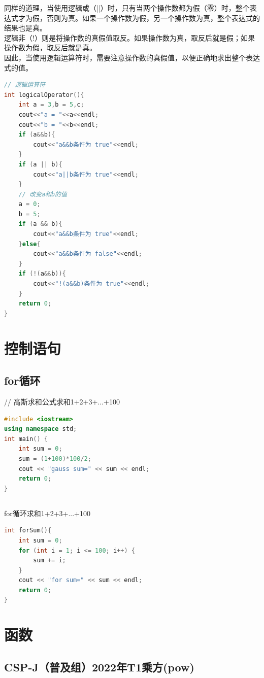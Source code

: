 \documentclass[12pt,twiside,a4paper]{ctexbook}
\numberwithin{chapter}{part}
\begin{document}
同样的道理，当使用逻辑或（||）时，只有当两个操作数都为假（零）时，整个表达式才为假，否则为真。如果一个操作数为假，另一个操作数为真，整个表达式的结果也是真。\\
逻辑非（!）则是将操作数的真假值取反。如果操作数为真，取反后就是假；如果操作数为假，取反后就是真。\\
因此，当使用逻辑运算符时，需要注意操作数的真假值，以便正确地求出整个表达式的值。
\begin{lstlisting}[language=C++]
// 逻辑运算符
int logicalOperator(){
	int a = 3,b = 5,c;
	cout<<"a = "<<a<<endl;
	cout<<"b = "<<b<<endl;
	if (a&&b){
		cout<<"a&&b条件为 true"<<endl;
	}
	if (a || b){
		cout<<"a||b条件为 true"<<endl;
	}
	// 改变a和b的值
	a = 0;
	b = 5;
	if (a && b){
		cout<<"a&&b条件为 true"<<endl;
	}else{
		cout<<"a&&b条件为 false"<<endl;
	}
	if (!(a&&b)){
		cout<<"!(a&&b)条件为 true"<<endl;
	}
	return 0;
}
\end{lstlisting}

\chapter{控制语句}
\section{for循环}
// 高斯求和公式求和1+2+3+...+100
\begin{lstlisting}[language=C++]
#include <iostream>
using namespace std;
int main() {
    int sum = 0;
    sum = (1+100)*100/2;
    cout << "gauss sum=" << sum << endl;
    return 0;
}
\end{lstlisting}

\section{}
for循环求和1+2+3+...+100\\
\begin{lstlisting}[language=C++]
int forSum(){
    int sum = 0;
    for (int i = 1; i <= 100; i++) {
        sum += i;
    }
    cout << "for sum=" << sum << endl;
    return 0;
}
\end{lstlisting}

\chapter{函数}
\section{CSP-J（普及组）2022年T1乘方(pow)}
\end{document}
